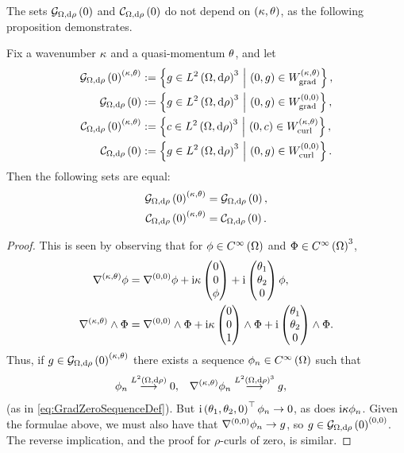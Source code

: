 The sets $\gradZero{\ddom}{\rho}$ and $\curlZero{\ddom}{\rho}$ do not depend on $\kt$, as the following proposition demonstrates.
\begin{prop} \label{prop:ZeroInvariantUnderQM-Wavenumber}
	Fix a wavenumber $\wavenumber$ and a quasi-momentum $\qm$, and let
	\begin{align*}
		\gradZero{\ddom}{\rho}^{\kt} &:= \clbracs{ g\in \ltwo{\ddom}{\rho}^3 \setVert \bracs{0,g}\in W^{\kt}_\mathrm{grad} }, \\
		\gradZero{\ddom}{\rho} &:= \clbracs{ g\in \ltwo{\ddom}{\rho}^3 \setVert \bracs{0,g}\in W^{\bracs{0, 0}}_\mathrm{grad} }, \\
		\curlZero{\ddom}{\rho}^{\kt} &:= \clbracs{ c\in \ltwo{\ddom}{\rho}^3 \setVert \bracs{0,c}\in W^{\kt}_\mathrm{curl} }, \\
		\curlZero{\ddom}{\rho} &:= \clbracs{ g\in \ltwo{\ddom}{\rho}^3 \setVert \bracs{0,g}\in W^{\bracs{0, 0}}_\mathrm{curl} }.
	\end{align*}
	Then the following sets are equal:
	\begin{align*}
		\gradZero{\ddom}{\rho}^{\kt} &= \gradZero{\ddom}{\rho}, \\
		\curlZero{\ddom}{\rho}^{\kt} &= \curlZero{\ddom}{\rho}.
	\end{align*}
\end{prop}
\begin{proof}
	This is seen by observing that for $\phi\in\smooth{\ddom}$ and $\Phi\in\smooth{\ddom}^3$,
	\begin{align*}
		\grad^{\kt}\phi &= \grad^{\bracs{0, 0}}\phi + \rmi\wavenumber\begin{pmatrix} 0 \\ 0 \\ \phi \end{pmatrix} + \rmi\begin{pmatrix} \qm_1 \\ \qm_2 \\ 0 \end{pmatrix}\phi, \\
		\grad^{\kt}\wedge\Phi &= \grad^{\bracs{0, 0}}\wedge\Phi + \rmi\wavenumber\begin{pmatrix} 0 \\ 0 \\ 1 \end{pmatrix}\wedge\Phi + \rmi\begin{pmatrix} \qm_1 \\ \qm_2 \\ 0 \end{pmatrix} \wedge \Phi.
	\end{align*}
	Thus, if $g\in \gradZero{\ddom}{\rho}^{\kt}$ there exists a sequence $\phi_n\in\smooth{\ddom}$ such that
	\begin{align*}
		\phi_n \lconv{\ltwo{\ddom}{\rho}} 0, &\quad \ktgrad\phi_n \lconv{ \ltwo{\ddom}{\rho}^3 } g,
	\end{align*}
	(as in \eqref{eq:GradZeroSequenceDef}).
	But $\rmi\bracs{\qm_1, \qm_2, 0}^{\top}\phi_n\rightarrow 0$, as does $\rmi\wavenumber\phi_n$.
	Given the formulae above, we must also have that $\grad^{\bracs{0, 0}}\phi_n\rightarrow g$, so $g\in \gradZero{\ddom}{\rho}^{\bracs{0, 0}}$.
	The reverse implication, and the proof for $\rho$-curls of zero, is similar.
\end{proof}

